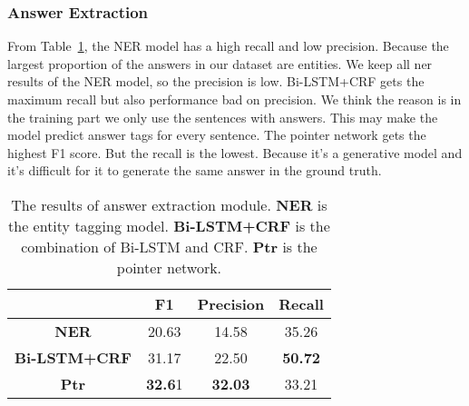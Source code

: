\subsubsection{Answer Extraction}

From Table~\ref{tab:answer}, the NER model has a high recall and low precision. Because the largest proportion of the answers in our dataset are entities. We keep all ner results of the NER model, so the precision is low. Bi-LSTM+CRF gets the maximum recall but also performance bad on precision. We think the reason is in the training part we only use the sentences with answers. This may make the model predict answer tags for every sentence. The pointer network gets the highest F1 score. But the recall is the lowest. Because it's a generative model and it's difficult for it to generate the same answer in the ground truth.

\begin{table}[th]
\small
\centering
\begin{tabular}{cccc}
\hline
\textbf{} & \textbf{F1} & \textbf{Precision} & \textbf{Recall} \\ \hline\hline
\textbf{NER} & 20.63 & 14.58 & 35.26 \\ 
\textbf{Bi-LSTM+CRF} & 31.17 & 22.50 & \textbf{50.72} \\ 
\textbf{Ptr} & \textbf{32.6}1 & \textbf{32.03} & 33.21 \\ \hline
\end{tabular}
\caption{\label{tab:answer} The results of answer extraction module. \textbf{NER} is the entity tagging model. \textbf{Bi-LSTM+CRF} is the combination of Bi-LSTM and CRF. \textbf{Ptr} is the pointer network.}
\end{table}


